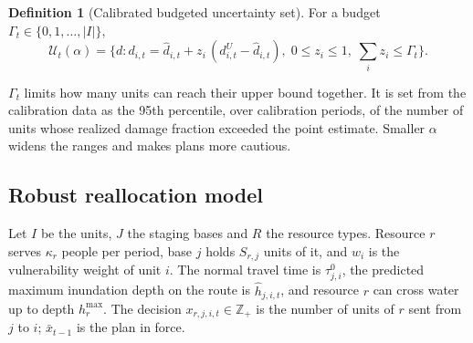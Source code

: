 \documentclass[pdflatex,sn-basic]{sn-jnl}
\theoremstyle{plain}%
\theoremstyle{remark}%
\theoremstyle{definition}%
\newtheorem{definition}{Definition}%
\begin{document}
\begin{definition}[Calibrated budgeted uncertainty set]\label{def:set}
For a budget $\Gamma_t \in \{0, 1, \dots, |I|\}$,
\begin{equation}
\mathcal{U}_t(\alpha) = \Big\{ d : d_{i,t} = \hat d_{i,t} + z_i\,(d^{U}_{i,t} - \hat d_{i,t}),\; 0 \le z_i \le 1,\; \sum_{i} z_i \le \Gamma_t \Big\}.
\label{eq:set}
\end{equation}
\end{definition}

$\Gamma_t$ limits how many units can reach their upper bound together. It is set from the calibration data as the 95th percentile, over calibration periods, of the number of units whose realized damage fraction exceeded the point estimate. Smaller $\alpha$ widens the ranges and makes plans more cautious.

\subsection{Robust reallocation model}

Let $I$ be the units, $J$ the staging bases and $R$ the resource types. Resource $r$ serves $\kappa_r$ people per period, base $j$ holds $S_{r,j}$ units of it, and $w_i$ is the vulnerability weight of unit $i$. The normal travel time is $\tau^0_{j,i}$, the predicted maximum inundation depth on the route is $\hat h_{j,i,t}$, and resource $r$ can cross water up to depth $h^{\max}_r$. The decision $x_{r,j,i,t} \in \mathbb{Z}_{+}$ is the number of units of $r$ sent from $j$ to $i$; $\bar x_{t-1}$ is the plan in force.
\end{document}
